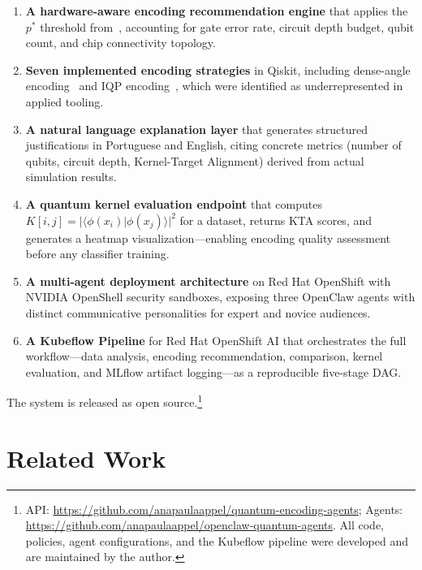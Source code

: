\documentclass[sigconf,nonacm]{acmart}
\begin{document}
\begin{enumerate}
  \item \textbf{A hardware-aware encoding recommendation engine} that applies the
    $p^{*}$ threshold from~\cite{sammartino2026}, accounting for gate error rate,
    circuit depth budget, qubit count, and chip connectivity topology.

  \item \textbf{Seven implemented encoding strategies} in Qiskit, including
    dense-angle encoding~\cite{sammartino2026} and IQP encoding~\cite{havlicek2019},
    which were identified as underrepresented in applied tooling.

  \item \textbf{A natural language explanation layer} that generates structured
    justifications in Portuguese and English, citing concrete metrics (number of
    qubits, circuit depth, Kernel-Target Alignment) derived from actual simulation
    results.

  \item \textbf{A quantum kernel evaluation endpoint} that computes
    $K[i,j] = |\langle\phi(x_i)|\phi(x_j)\rangle|^2$ for a dataset, returns KTA
    scores, and generates a heatmap visualization---enabling encoding quality
    assessment before any classifier training.

  \item \textbf{A multi-agent deployment architecture} on Red Hat OpenShift with
    NVIDIA OpenShell security sandboxes, exposing three OpenClaw agents with distinct
    communicative personalities for expert and novice audiences.

  \item \textbf{A Kubeflow Pipeline} for Red Hat OpenShift AI that orchestrates the
    full workflow---data analysis, encoding recommendation, comparison, kernel
    evaluation, and MLflow artifact logging---as a reproducible five-stage DAG.
\end{enumerate}

The system is released as open source.\footnote{
  API: \url{https://github.com/anapaulaappel/quantum-encoding-agents};
  Agents: \url{https://github.com/anapaulaappel/openclaw-quantum-agents}.
  All code, policies, agent configurations, and the Kubeflow pipeline were
  developed and are maintained by the author.}

\section{Related Work}
\end{document}
